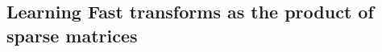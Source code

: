 %
%


%
%
%


\subsection{Learning Fast transforms as the product of sparse matrices}
\label{sec:palm4led}


